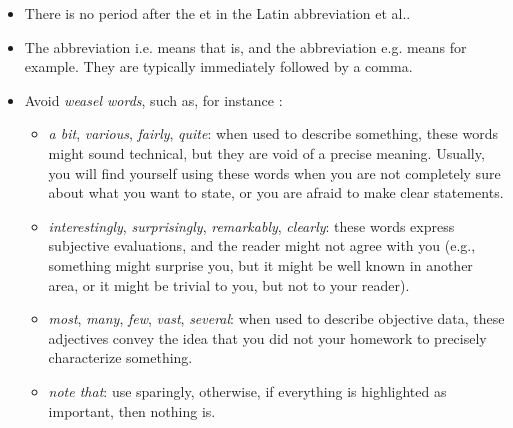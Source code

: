 \documentclass[letterpaper, 10 pt, conference]{ieeeconf}
\begin{document}
\begin{itemize}
\item There is no period after the et in the Latin abbreviation et al..
\item The abbreviation i.e. means that is, and the abbreviation e.g. means for example. They are typically immediately followed by a comma.
\item Avoid \emph{weasel words}, such as, for instance \cite{WeaselWords}:
  \begin{itemize}
  \item \emph{a bit}, \emph{various}, \emph{fairly}, \emph{quite}: when used to describe something, these words might sound technical, but they are void of a precise meaning. Usually, you will find yourself using these words when you are not completely sure about what you want to state, or you are afraid to make clear statements.
  \item \emph{interestingly}, \emph{surprisingly}, \emph{remarkably}, \emph{clearly}: these words express subjective evaluations, and the reader might not agree with you (e.g., something might surprise you, but it might be well known in another area, or it might be trivial to you, but not to your reader).
  \item \emph{most}, \emph{many}, \emph{few}, \emph{vast}, \emph{several}: when used to describe objective data, these adjectives convey the idea that you did not your homework to precisely characterize something.
  \item \emph{note that}: use sparingly, otherwise, if everything is highlighted as important, then nothing is.
  \end{itemize}
\end{itemize}
\end{document}
